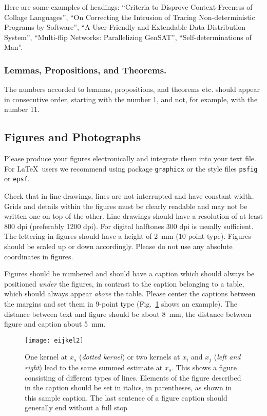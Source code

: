 \documentclass[runningheads]{llncs}
\begin{document}
Here are
some examples of headings: ``Criteria to Disprove Context-Freeness of
Collage Languages'', ``On Correcting the Intrusion of Tracing
Non-deterministic Programs by Software'', ``A User-Friendly and
Extendable Data Distribution System'', ``Multi-flip Networks:
Parallelizing GenSAT'', ``Self-determinations of Man''.

\subsubsection{Lemmas, Propositions, and Theorems.}

The numbers accorded to lemmas, propositions, and theorems etc. should
appear in consecutive order, starting with the number 1, and not, for
example, with the number 11.

\subsection{Figures and Photographs}
\label{sect:figures}

Please produce your figures electronically and integrate
them into your text file. For \LaTeX\ users we recommend using package
\verb+graphicx+ or the style files \verb+psfig+ or \verb+epsf+.

Check that in line drawings, lines are not
interrupted and have constant width. Grids and details within the
figures must be clearly readable and may not be written one on top of
the other. Line drawings should have a resolution of at least 800 dpi
(preferably 1200 dpi).
For digital halftones 300 dpi is usually sufficient.
The lettering in figures should have a height of 2~mm (10-point type).
Figures should be scaled up or down accordingly.
Please do not use any absolute coordinates in figures.

Figures should be numbered and should have a caption which should
always be positioned {\it under} the figures, in contrast to the caption
belonging to a table, which should always appear {\it above} the table.
Please center the captions between the margins and set them in
9-point type
(Fig.~\ref{fig:example} shows an example).
The distance between text and figure should be about 8~mm, the
distance between figure and caption about 5~mm.
\begin{figure}
\centering
\texttt{[image: eijkel2]}
\caption{One kernel at $x_s$ ({\it dotted kernel}) or two kernels at
$x_i$ and $x_j$ ({\it left and right}) lead to the same summed estimate
at $x_s$. This shows a figure consisting of different types of
lines. Elements of the figure described in the caption should be set in
italics,
in parentheses, as shown in this sample caption. The last
sentence of a figure caption should generally end without a full stop}
\label{fig:example}
\end{figure}
\end{document}
